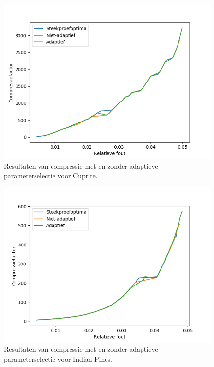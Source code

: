 \newpage
\begin{figure}[H]
  \centering
  \includegraphics[scale=0.7]{images/parameter_functions_results_including_adaptive_Cuprite_tensor_trains.png}
  \caption{Resultaten van compressie met en zonder adaptieve parameterselectie voor Cuprite.}
  \label{fig:parameter_functions_results_including_adaptive_Cuprite_tensor_trains}
\end{figure}

\begin{figure}[H]
  \centering
  \includegraphics[scale=0.7]{images/parameter_functions_results_including_adaptive_Indian_Pines_tensor_trains.png}
  \caption{Resultaten van compressie met en zonder adaptieve parameterselectie voor Indian Pines.}
  \label{fig:parameter_functions_results_including_adaptive_Indian_Pines_tensor_trains}
\end{figure}

\newpage
